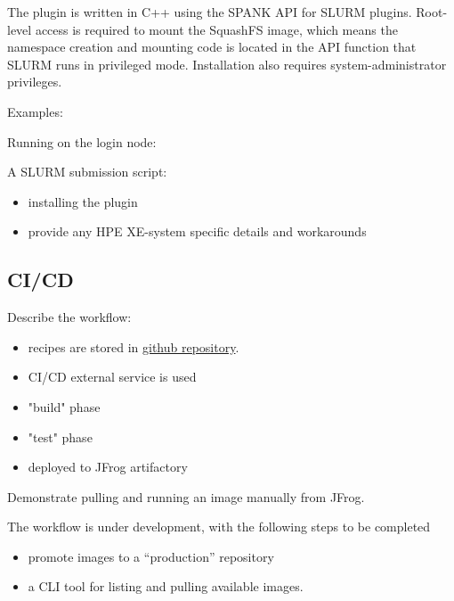 The plugin is written in C++ using the SPANK API for SLURM plugins.
Root-level access is required to mount the SquashFS image, which means the namespace creation and mounting code is located in the API function that SLURM runs in privileged mode.
Installation also requires system-administrator privileges.

Examples:

Running on the login node:


A SLURM submission script:


\begin{itemize}
    \item installing the plugin
    \item provide any HPE XE-system specific details and workarounds
\end{itemize}

\subsection{CI/CD}


Describe the workflow:
\begin{itemize}
    \item recipes are stored in \href{https://github.com/eth-cscs/alps-spack-stacks}{github repository}.
    \item CI/CD external service is used
    \item "build" phase
    \item "test" phase
    \item deployed to JFrog artifactory
\end{itemize}

Demonstrate pulling and running an image manually from JFrog.

The workflow is under development, with the following steps to be completed
\begin{itemize}
    \item promote images to a ``production'' repository
    \item a CLI tool for listing and pulling available images.
\end{itemize}


